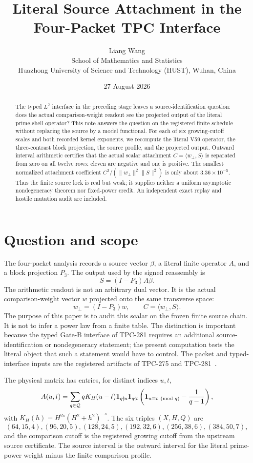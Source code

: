 \documentclass[11pt]{article}
\title{Literal Source Attachment in the Four-Packet TPC Interface}
\author{Liang Wang\\
School of Mathematics and Statistics\\
Huazhong University of Science and Technology (HUST), Wuhan, China}
\date{27 August 2026}
\begin{document}
\maketitle

\begin{abstract}
The typed $L^2$ interface in the preceding stage leaves a source-identification
question: does the actual comparison-weight readout see the projected output
of the literal prime-shell operator?  This note answers the question on the
registered finite schedule without replacing the source by a model functional.
For each of six growing-cutoff scales and both recorded kernel exponents, we
recompute the literal V59 operator, the three-contrast block projection, the
source profile, and the projected output.  Outward interval arithmetic certifies
that the actual scalar attachment $C=\langle w_\perp,S\rangle$ is separated
from zero on all twelve rows: eleven are negative and one is positive.  The
smallest normalized attachment coefficient $C^2/(\|w_\perp\|^2\|S\|^2)$ is
only about $3.36\times 10^{-5}$.  Thus the finite source lock is real but weak;
it supplies neither a uniform asymptotic nondegeneracy theorem nor fixed-power
credit.  An independent exact replay and hostile mutation audit are included.
\end{abstract}

\section{Question and scope}

The four-packet analysis records a source vector $\beta$, a literal finite
operator $A$, and a block projection $P_3$.  The output used by the signed
reassembly is
\[
  S=(I-P_3)A\beta.
\]
The arithmetic readout is not an arbitrary dual vector.  It is the actual
comparison-weight vector $w$ projected onto the same transverse space:
\[
  w_\perp=(I-P_3)w,\qquad C=\langle w_\perp,S\rangle.
\]
The purpose of this paper is to audit this scalar on the frozen finite source
chain.  It is not to infer a power law from a finite table.  The distinction is
important because the typed Gate-B interface of TPC-281 requires an additional
source-identification or nondegeneracy statement; the present computation
tests the literal object that such a statement would have to control.  The
packet and typed-interface inputs are the registered artifacts of
TPC-275 and TPC-281~\cite{tpc275,tpc281}.

The physical matrix has entries, for distinct indices $u,t$,
\begin{equation}
 A(u,t)=\sum_{q\in\mathcal Q}qK_H(u-t)
  {\bf 1}_{q\nmid u}{\bf 1}_{q\nmid t}
  \left({\bf 1}_{u\equiv t\pmod q}-\frac{1}{q-1}\right),
 \label{eq:operator}
\end{equation}
with $K_H(h)=H^{2s}(H^2+h^2)^{-s}$.  The six triples $(X,H,Q)$ are
\[
 (64,15,4),(96,20,5),(128,24,5),(192,32,6),
 (256,38,6),(384,50,7),
\]
and the comparison cutoff is the registered growing cutoff from the upstream
source certificate.  The source interval is the outward interval for the
literal prime-power weight minus the finite comparison profile.
\end{document}
